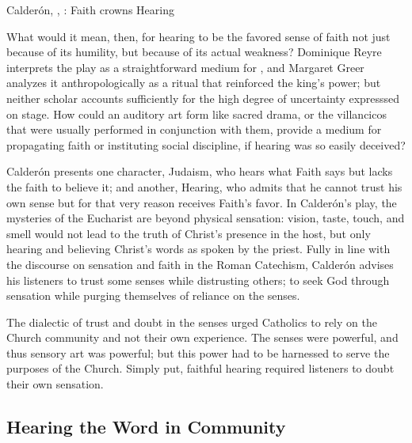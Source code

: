 \begin{expoem}
    \caption{Calderón, , : 
    Faith crowns Hearing}
    \label{expoem:Calderon-Retiro-Hearing}
\end{expoem}

What would it mean, then, for hearing to be the favored sense of faith not just 
because of its humility, but because of its actual weakness?
Dominique Reyre interprets the play as a straightforward medium for
, and Margaret Greer analyzes it anthropologically
as a ritual that reinforced the king's power; but neither scholar accounts
sufficiently for the high degree of uncertainty expresssed on stage.%
    \Autocites{Reyre:Retiro}{Greer:Retiro}
How could an auditory art form like sacred drama, or the villancicos that were
usually performed in conjunction with them, provide a medium for propagating
faith or instituting social discipline, if hearing was so easily deceived?

Calderón presents one character, Judaism, who hears what Faith says but lacks 
the faith to believe it; and another, Hearing, who admits that he cannot trust 
his own sense but for that very reason receives Faith's favor.
In Calderón's play, the mysteries of the Eucharist are beyond physical 
sensation: vision, taste, touch, and smell would not lead to the truth of 
Christ's presence in the host, but only hearing and believing Christ's words 
 as spoken by the priest.
Fully in line with the discourse on sensation and faith in the Roman Catechism, 
Calderón advises his listeners to trust some senses while distrusting others; 
to seek God through sensation while purging themselves of reliance on the 
senses.

The dialectic of trust and doubt in the senses urged Catholics to rely on the 
Church community and not their own experience.
The senses were powerful, and thus sensory art was powerful; but this power had 
to be harnessed to serve the purposes of the Church.
Simply put, faithful hearing required listeners to doubt their own sensation.

\subsection{Hearing the Word in Community}


